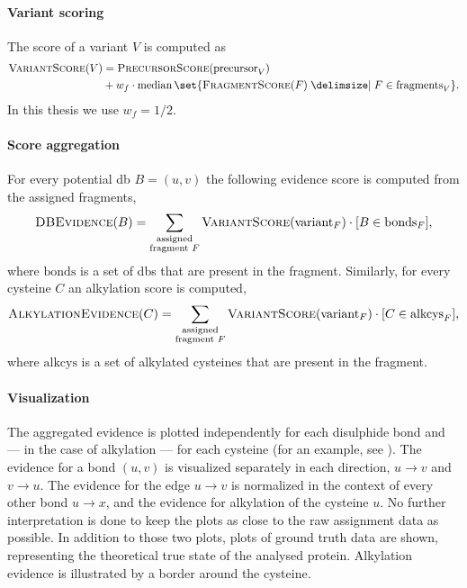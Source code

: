 \paragraph{Variant scoring} The score of a variant \(V\) is computed as \begin{align*}
  \textsc{VariantScore}(V) & = \textsc{PrecursorScore}(\mathrm{precursor}_V)                                                        \\
                           & + w_f \cdot \operatorname{median} \set{ \textsc{FragmentScore}(F) \given F \in \mathrm{fragments}_V }.
\end{align*} In this thesis we use \(w_f = 1/2\).

\paragraph{Score aggregation} For every potential \gls*{db} \(B = (u, v)\) the following evidence score is computed  from the assigned fragments, \[\textsc{DBEvidence}(B) = \sum_{\substack{ \text{assigned} \\ \text{fragment } F }} \textsc{VariantScore}(\mathrm{variant}_F) \cdot [B \in \mathrm{bonds}_F], \] where \(\mathrm{bonds}\) is a set of \glspl*{db} that are present in the fragment. Similarly, for every cysteine \(C\) an alkylation score is computed, \[\textsc{AlkylationEvidence}(C) = \sum_{\substack{ \text{assigned} \\ \text{fragment } F }} \textsc{VariantScore}(\mathrm{variant}_F) \cdot [C \in \mathrm{alkcys}_F],\] where \(\mathrm{alkcys}\) is a set of alkylated cysteines that are present in the fragment.

\paragraph{Visualization} The aggregated evidence is plotted independently for each disulphide bond and --- in the case of alkylation --- for each cysteine (for an example, see ). The evidence for a bond \((u, v)\) is visualized separately in each direction, \(u \to v\) and \(v \to u\). The evidence for the edge \(u \to v\) is normalized in the context of every other bond \(u \to x\), and the evidence for alkylation of the cysteine \(u\). No further interpretation is done to keep the plots as close to the raw assignment data as possible. In addition to those two plots, plots of ground truth data are shown, representing the theoretical true state of the analysed protein. Alkylation evidence is illustrated by a border around the cysteine.

